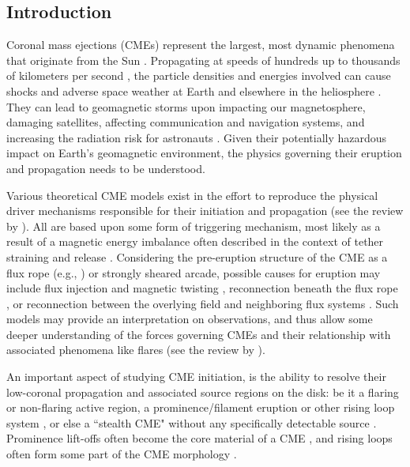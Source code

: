 \documentclass[namedreferences]{solarphysics}
\begin{document}
\begin{article}
\section{Introduction}
\label{intro}

Coronal mass ejections (CMEs) represent the largest, most dynamic phenomena that originate from the Sun \cite{2012LRSP....9....3W}. Propagating at speeds of hundreds up to thousands of kilometers per second \cite{2004JGRA..10907105Y}, the particle densities and energies involved can cause shocks and adverse space weather at Earth and elsewhere in the heliosphere \cite{2004Natur.432...78P,2005AnGeo..23.1033S,2013NatPh...9..811C,2014NatCo...5E3481L}. They can lead to geomagnetic storms upon impacting our magnetosphere, damaging satellites, affecting communication and navigation systems, and increasing the radiation risk for astronauts \cite{2007A&G....48f..11L}. Given their potentially hazardous impact on Earth's geomagnetic environment, the physics governing their eruption and propagation needs to be understood. 

Various theoretical CME models exist in the effort to reproduce the physical driver mechanisms responsible for their initiation and propagation (see the review by ). All are based upon some form of triggering mechanism, most likely as a result of a magnetic energy imbalance often described in the context of tether straining and release \cite{2001AGUGM.125..143K}. Considering the pre-eruption structure of the CME as a flux rope (e.g., ) or strongly sheared arcade, possible causes for eruption may include flux injection and magnetic twisting \cite{2001ApJ...562.1045K,2006PhRvL..96y5002K}, reconnection beneath the flux rope \cite{1980IAUS...91..207M,1995ApJ...446..377F,2003ApJ...595.1231A,2007ApJ...658L.123L}, or reconnection between the overlying field and neighboring flux systems \cite{1999ApJ...510..485A,2007ApJ...671L..77V,2008ApJ...683.1192L}. Such models may provide an interpretation on observations, and thus allow some deeper understanding of the forces governing CMEs and their relationship with associated phenomena like flares (see the review by ).

An important aspect of studying CME initiation, is the ability to resolve their low-coronal propagation and associated source regions on the disk: be it a flaring or non-flaring active region, a prominence/filament eruption or other rising loop system \cite{2001ApJ...561..372S,2002ApJ...566L.117Z}, or else a ``stealth CME" without any specifically detectable source \cite{2013SoPh..285..269H}. Prominence lift-offs often become the core material of a CME \cite{2003ApJ...586..562G,2008AnGeo..26.3025F}, and rising loops often form some part of the CME morphology \cite{2004A&A...422..307C,2006A&A...455..339D}.


\end{article}
\end{document}
